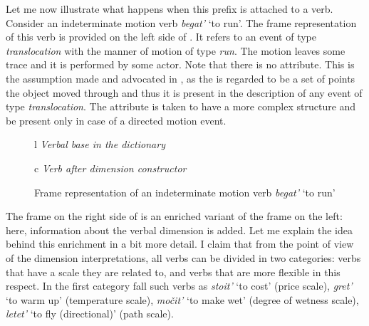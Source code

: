 Let me now illustrate what happens when this prefix is attached to a verb. Consider an indeterminate motion verb \textit{begat'} `to run'. The frame representation of this verb is provided on the left side of . It refers to an event of type \textit{translocation} with the manner of motion of type \textit{run}. The motion leaves some trace and it is performed by some actor. Note that there is no \PATH attribute. This is the assumption made and advocated in \citealt{ZinovaOsswald:paper}, as the \TRACE is regarded to be a set of points the object moved through and thus it is present in the description of any event of type \textit{translocation}. The \PATH attribute is taken to have a more complex structure and be present only in case of a directed motion event.

\begin{figure}
\begin{tabular}[t]{l}
\textit{Verbal base in the dictionary}\\
\end{tabular}
\hfill
\begin{tabular}[t]{c}
\textit{Verb after dimension constructor}\\
\end{tabular}
\caption{Frame representation of an indeterminate motion verb \textit{begat'} `to run' \label{frame:begat}}
\end{figure}

The frame on the right side of  is an enriched variant of the frame on the left: here, information about the verbal dimension is added. Let me explain the idea behind this enrichment in a bit more detail. I claim that from the point of view of the dimension interpretations, all verbs can be divided in two categories: verbs that have a scale they are related to, and verbs that are more flexible in this respect. In the first category fall such verbs as \textit{stoit'} `to cost' (price scale), \textit{gret'} `to warm up' (temperature scale), \textit{mo\v{c}it'} `to make wet' (degree of wetness scale), \textit{letet'} `to fly (directional)' (path scale). 

